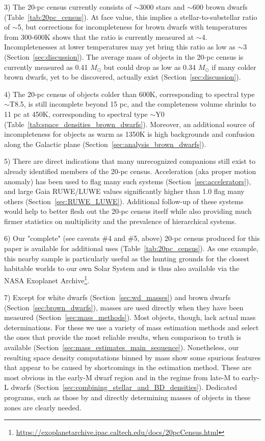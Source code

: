 \documentclass[twocolumn,tighten,twocolappendix]{aastex631}
\begin{document}
3) The 20-pc census currently consists of $\sim$3000 stars and $\sim$600 brown dwarfs (Table~\ref{tab:20pc_census}). At face value, this implies a stellar-to-substellar ratio of $\sim$5, but corrections for incompleteness for brown dwarfs with temperatures from 300-600K shows that the ratio is currently measured at $\sim$4. Incompletenesses at lower temperatures may yet bring this ratio as low as $\sim$3 (Section~\ref{sec:discussion}). The average mass of objects in the 20-pc census is currently measured as 0.41 $M_\odot$ but could drop as low as 0.34 $M_\odot$ if many colder brown dwarfs, yet to be discovered, actually exist (Section~\ref{sec:discussion}).

4) The 20-pc census of objects colder than 600K, corresponding to spectral type $\sim$T8.5, is still incomplete beyond 15 pc, and the completeness volume shrinks to 11 pc at 450K, corresponding to spectral type $\sim$Y0 (Table~\ref{tab:space_densities_brown_dwarfs}). Moreover, an additional source of incompleteness for objects as warm as 1350K is high backgrounds and confusion along the Galactic plane (Section~\ref{sec:analysis_brown_dwarfs}).

5) There are direct indications that many unrecognized companions still exist to already identified members of the 20-pc census. Acceleration (aka proper motion anomaly) has been used to flag many such systems (Section~\ref{sec:accelerators}), and large Gaia RUWE/LUWE values significantly higher than 1.0 flag many others (Section~\ref{sec:RUWE_LUWE}). Additional follow-up of these systems would help to better flesh out the 20-pc census itself while also providing much firmer statistics on multiplicity and the prevalence of hierarchical systems.

6) Our "complete" (see caveats \#4 and \#5, above) 20-pc census produced for this paper is available for additional uses (Table~\ref{tab:20pc_census}). As one example, this nearby sample is particularly useful as the hunting grounds for the closest habitable worlds to our own Solar System and is thus also available via the NASA Exoplanet Archive\footnote{\url{ https://exoplanetarchive.ipac.caltech.edu/docs/20pcCensus.html}}.

7) Except for white dwarfs (Section~\ref{sec:wd_masses}) and brown dwarfs (Section~\ref{sec:brown_dwarfs}), masses are used directly when they have been measured (Section~\ref{sec:mass_methods}). Most objects, though, lack actual mass determinations.  For these we use a variety of mass estimation methods and select the ones that provide the most reliable results, when comparison to truth is available (Section~\ref{sec:mass_estimates_main_sequence}). Nonetheless, our resulting space density computations binned by mass show some spurious features that appear to be caused by shortcomings in the estimation method. These are most obvious in the early-M dwarf region and in the regime from late-M to early-L dwarfs  (Section~\ref{sec:combining_stellar_and_BD_densities}). Dedicated programs, such as those by \cite{vrijmoet2022} and \cite{dupuy2022} directly determining masses of objects in these zones are clearly needed.
\end{document}

